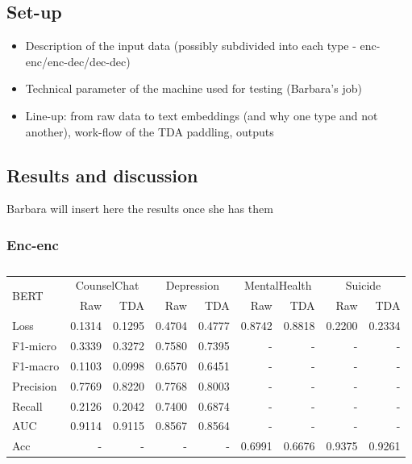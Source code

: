 \documentclass{article}
\begin{document}
\subsection{Set-up}

\begin{itemize}
    \item Description of the input data (possibly subdivided into each type - enc-enc/enc-dec/dec-dec)
    \item Technical parameter of the machine used for testing (Barbara's job)
    \item Line-up: from raw data to text embeddings (and why one type and not another), work-flow of the TDA paddling, 
    outputs
\end{itemize}

\subsection{Results and discussion}

Barbara will insert here the results once she has them

\subsubsection{Enc-enc}

\begin{table}[h!]
\begin{adjustbox}{width=\columnwidth,center}
\begin{tabular}[t]{lrrrrrrrr}
\toprule
\multirow{2}{*}{BERT} & \multicolumn{2}{c}{CounselChat} & \multicolumn{2}{c}{Depression}  & \multicolumn{2}{c}{MentalHealth} & \multicolumn{2}{c}{Suicide} \\
\cmidrule(l{3pt}r{3pt}){2-3} \cmidrule(l{3pt}r{3pt}){4-5} \cmidrule(l{3pt}r{3pt}){6-7} \cmidrule(l{3pt}r{3pt}){8-9}
 & Raw & TDA & Raw & TDA & Raw & TDA & Raw & TDA \\
\midrule 
Loss   & 0.1314 & 0.1295 & 0.4704 & 0.4777 & 0.8742 & 0.8818 & 0.2200 & 0.2334 \\ 
F1-micro   & 0.3339 & 0.3272 & 0.7580 & 0.7395 & - & - & - & - \\
F1-macro   & 0.1103 & 0.0998 & 0.6570 & 0.6451 & - & - & - & - \\
Precision  & 0.7769 & 0.8220 & 0.7768 & 0.8003 & - & - & - & - \\
Recall   & 0.2126 & 0.2042 & 0.7400 & 0.6874 & - & - & - & - \\
AUC   & 0.9114 & 0.9115 & 0.8567 & 0.8564 & - & - & - & - \\
Acc   & - & - & - & - & 0.6991 & 0.6676 & 0.9375 & 0.9261 \\ 
\bottomrule
\end{tabular}
\end{adjustbox}
\caption{}
\label{tbl:enc-enc_bert}
\end{table}
\end{document}
